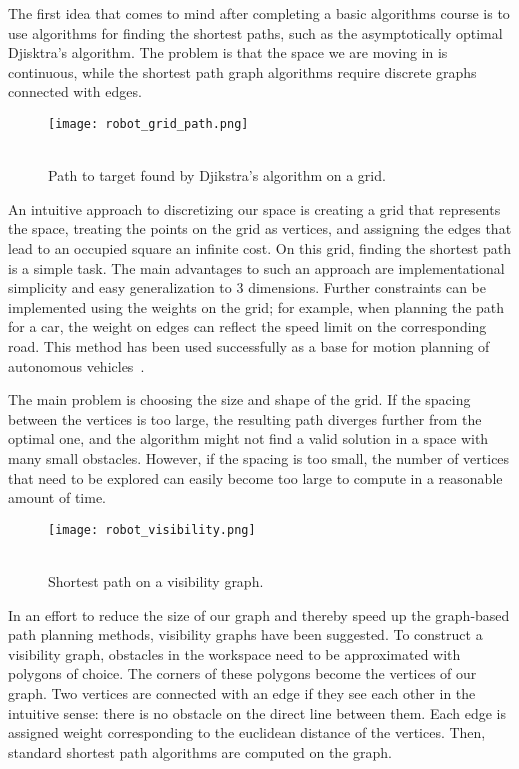 The first idea that comes to mind after completing a basic algorithms course is to use algorithms for finding the shortest paths, such as the asymptotically optimal Djisktra's algorithm. The problem is that the space we are moving in is continuous, while the shortest path graph algorithms require discrete graphs connected with edges.

\begin{wrapfigure}{r}{0.33\textwidth}
    \centering
    \texttt{[image: robot\_grid\_path.png]}
  \caption{\\Path to target found by Djikstra's algorithm on a grid.}\label{fig:grid}
\end{wrapfigure}

An intuitive approach to discretizing our space is creating a grid that represents the space, treating the points on the grid as vertices, and assigning the edges that lead to an occupied square an infinite cost. On this grid, finding the shortest path is a simple task. The main advantages to such an approach are implementational simplicity and easy generalization to 3 dimensions. Further constraints can be implemented using the weights on the grid; for example, when planning the path for a car, the weight on edges can reflect the speed limit on the corresponding road.
This method has been used successfully as a base for motion planning of autonomous vehicles~\cite{grid1, grid2}.

The main problem is choosing the size and shape of the grid. If the spacing between the vertices is too large, the resulting path diverges further from the optimal one, and the algorithm might not find a valid solution in a space with many small obstacles. However, if the spacing is too small, the number of vertices that need to be explored can easily become too large to compute in a reasonable amount of time.


\begin{wrapfigure}{r}{0.33\textwidth}
    \centering
    \texttt{[image: robot\_visibility.png]}
  \caption{\\Shortest path on a visibility graph.}\label{fig:vis}
\end{wrapfigure}

In an effort to reduce the size of our graph and thereby speed up the graph-based path planning methods, visibility graphs have been suggested. To construct a visibility graph, obstacles in the workspace need to be approximated with polygons of choice. The corners of these polygons become the vertices of our graph. Two vertices are connected with an edge if they see each other in the intuitive sense: there is no obstacle on the direct line between them. Each edge is assigned weight corresponding to the euclidean distance of the vertices. Then, standard shortest path algorithms are computed on the graph.


